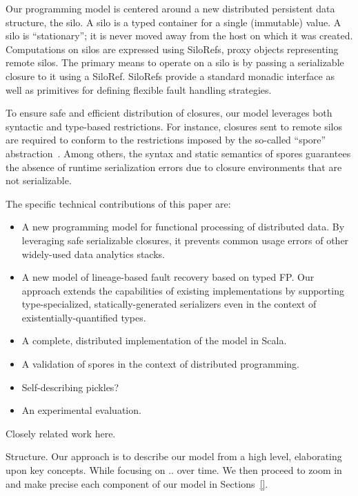 \documentclass[preprint]{sigplanconf}
\theoremstyle{definition}
\theoremstyle{definition}
\begin{document}
Our programming model is centered around a new distributed persistent data
structure, the silo. A silo is a typed container for a single (immutable)
value. A silo is ``stationary''; it is never moved away from the host on which
it was created. Computations on silos are expressed using SiloRefs, proxy
objects representing remote silos. The primary means to operate on a silo is
by passing a serializable closure to it using a SiloRef. SiloRefs provide a
standard monadic interface as well as primitives for defining flexible fault
handling strategies.

To ensure safe and efficient distribution of closures, our model leverages
both syntactic and type-based restrictions. For instance, closures sent to
remote silos are required to conform to the restrictions imposed by the so-called
``spore'' abstraction~\cite{Spores}. Among others, the syntax and
static semantics of spores guarantees the absence of runtime serialization
errors due to closure environments that are not serializable.

The specific technical contributions of this paper are:

\begin{itemize}
\item A new programming model for functional processing of distributed data. By
leveraging safe serializable closures, it prevents common usage errors of
other widely-used data analytics stacks.

\item A new model of lineage-based fault recovery based on typed FP. Our approach
extends the capabilities of existing implementations by supporting type-specialized,
statically-generated serializers even in the context of
existentially-quantified types.

\item A complete, distributed implementation of the model in Scala.

\item A validation of spores in the context of distributed programming.

\item Self-describing pickles?

\item An experimental evaluation.
\end{itemize}

Closely related work here.

Structure. Our approach is to describe our model from a high level,
elaborating upon key concepts. While focusing on .. over time. We then proceed
to zoom in and make precise each component of our model in Sections~\ref{}.
\end{document}
